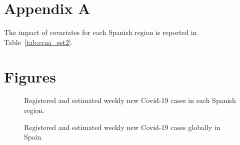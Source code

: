 \documentclass{bmcart}
\begin{document}
\begin{backmatter}



\section*{Appendix A}
The impact of covariates for each Spanish region is reported in Table~\ref{tab:ccaa_est2}.




\section*{Figures}

\begin{figure}[ht]
  \caption{\label{morina:fig1} Registered and estimated weekly new Covid-19 cases in each Spanish region.}
\end{figure}

\begin{figure}[ht]
  \caption{\label{morina:fig2} Registered and estimated weekly new Covid-19 cases globally in Spain.}
\end{figure}


\end{backmatter}
\end{document}
